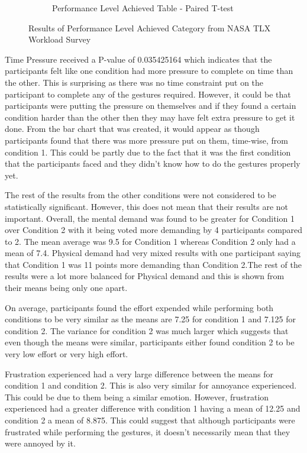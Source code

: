 \documentclass{l4proj}
\begin{document}
\begin{figure}[!htb]
\begin{subfigure}[b]{0.45\textwidth}
        \caption{Performance Level Achieved Table - Paired T-test}
        \label{fig:pLTable}
    \end{subfigure}
    \caption{Results of Performance Level Achieved Category from NASA TLX Workload Survey}
    \label{fig:PerformanceLevel}
    
\end{figure}

Time Pressure received a P-value of 0.035425164 which indicates that the participants felt like one condition had more pressure to complete on time than the other. This is surprising as there was no time constraint put on the participant to complete any of the gestures required. However, it could be that participants were putting the pressure on themselves and if they found a certain condition harder than the other then they may have felt extra pressure to get it done. From the bar chart that was created, it would appear as though participants found that there was more pressure put on them, time-wise, from condition 1. This could be partly due to the fact that it was the first condition that the participants faced and they didn’t know how to do the gestures properly yet.

The rest of the results from the other conditions were not considered to be statistically significant. However, this does not mean that their results are not important. Overall, the mental demand was found to be greater for Condition 1 over Condition 2 with it being voted more demanding by 4 participants compared to 2. The mean average was 9.5 for Condition 1 whereas Condition 2 only had a mean of 7.4. Physical demand had very mixed results with one participant saying that Condition 1 was 11 points more demanding than Condition 2.The rest of the results were a lot more balanced for Physical demand and this is shown from their means being only one apart.

On average, participants found the effort expended while performing both conditions to be very similar as the means are 7.25 for condition 1 and 7.125 for condition 2. The variance for condition 2 was much larger which suggests that even though the means were similar, participants either found condition 2 to be very low effort or very high effort.

Frustration experienced had a very large difference between the means for condition 1 and condition 2. This is also very similar for annoyance experienced. This could be due to them being a similar emotion. However, frustration experienced had a greater difference with condition 1 having a mean of 12.25 and condition 2 a mean of 8.875. This could suggest that although participants were frustrated while performing the gestures, it doesn't necessarily mean that they were annoyed by it. 
\end{document}
